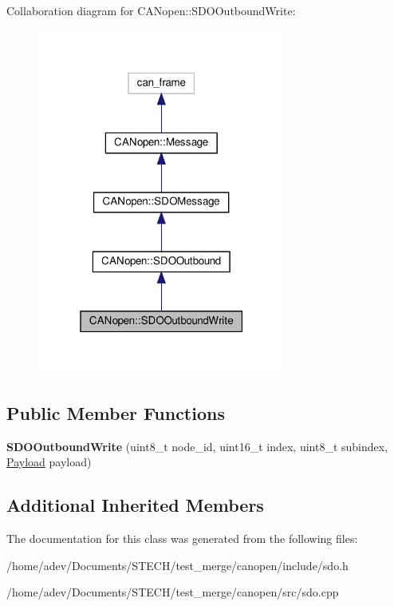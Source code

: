 Collaboration diagram for C\+A\+Nopen\+:\+:S\+D\+O\+Outbound\+Write\+:\nopagebreak
\begin{figure}[H]
\begin{center}
\leavevmode
\includegraphics[width=232pt]{class_c_a_nopen_1_1_s_d_o_outbound_write__coll__graph}
\end{center}
\end{figure}
\subsection*{Public Member Functions}
\begin{DoxyCompactItemize}
\item 
\mbox{\label{class_c_a_nopen_1_1_s_d_o_outbound_write_af86ced7cb745cc3b18c4cd7c1406a312}} 
{\bfseries S\+D\+O\+Outbound\+Write} (uint8\+\_\+t node\+\_\+id, uint16\+\_\+t index, uint8\+\_\+t subindex, \hyperlink{class_c_a_nopen_1_1_payload}{Payload} payload)
\end{DoxyCompactItemize}
\subsection*{Additional Inherited Members}


The documentation for this class was generated from the following files\+:\begin{DoxyCompactItemize}
\item 
/home/adev/\+Documents/\+S\+T\+E\+C\+H/test\+\_\+merge/canopen/include/sdo.\+h\item 
/home/adev/\+Documents/\+S\+T\+E\+C\+H/test\+\_\+merge/canopen/src/sdo.\+cpp\end{DoxyCompactItemize}
